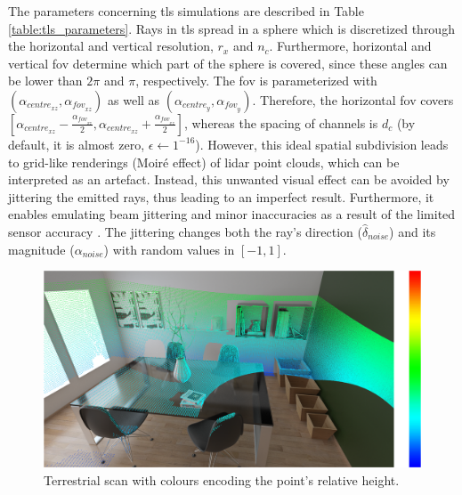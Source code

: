 The parameters concerning \acrshort{tls} simulations are described in Table \ref{table:tls_parameters}. Rays in \acrshort{tls} spread in a sphere which is discretized through the horizontal and vertical resolution, $r_x$ and $n_c$. Furthermore, horizontal and vertical \acrshort{fov} determine which part of the sphere is covered, since these angles can be lower than $2\pi$ and $\pi$, respectively. The \acrshort{fov} is parameterized with $(\alpha_{\textit{centre}_{xz}}, \alpha_{\textit{fov}_{xz}})$ as well as $(\alpha_{\textit{centre}_{y}}, \alpha_{\textit{fov}_{y}})$. Therefore, the horizontal \acrshort{fov} covers $[\alpha_{\textit{centre}_{xz}} - \frac{\alpha_{\textit{fov}_{xz}}}{2}, \alpha_{\textit{centre}_{xz}} + \frac{\alpha_{\textit{fov}_{xz}}}{2}]$, whereas the spacing of channels is $d_c$ (by default, it is almost zero, $\epsilon \gets 1^{-16}$). However, this ideal spatial subdivision leads to grid-like renderings (Moiré effect) of \acrshort{lidar} point clouds, which can be interpreted as an artefact. Instead, this unwanted visual effect can be avoided by jittering \cite{akenine-moller_real-time_2018} the emitted rays, thus leading to an imperfect result. Furthermore, it enables emulating beam jittering and minor inaccuracies as a result of the limited sensor accuracy \cite{mcmanamon_lidar_2019}. The jittering changes both the ray's direction ($\hat{\delta}_{\textit{noise}}$) and its magnitude ($\alpha_{\textit{noise}}$) with random values in $[-1, 1]$.

\begin{figure}[ht]
	\centering
	\includegraphics[width=\linewidth]{figs/lidar_simulation/tls_first_approach.png}
	\caption{Terrestrial scan with colours encoding the point's relative height.}
	\label{fig:tls_first_approach}
\end{figure}

